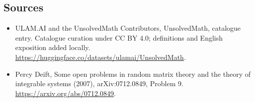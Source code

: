 \documentclass[11pt]{article}
\begin{document}
\subsection{Sources}
\begin{itemize}
\item[\hypertarget{source:statement:1}{S1}] ULAM.AI and the UnsolvedMath Contributors, UnsolvedMath, catalogue entry. Catalogue curation under CC BY 4.0; definitions and English exposition added locally.
\url{https://huggingface.co/datasets/ulamai/UnsolvedMath}.
\item[\hypertarget{source:statement:2}{S2}] Percy Deift, Some open problems in random matrix theory and the theory of integrable systems (2007), arXiv:0712.0849, Problem 9.
\url{https://arxiv.org/abs/0712.0849}.
\end{itemize}
\label{end:statement}
\end{document}
